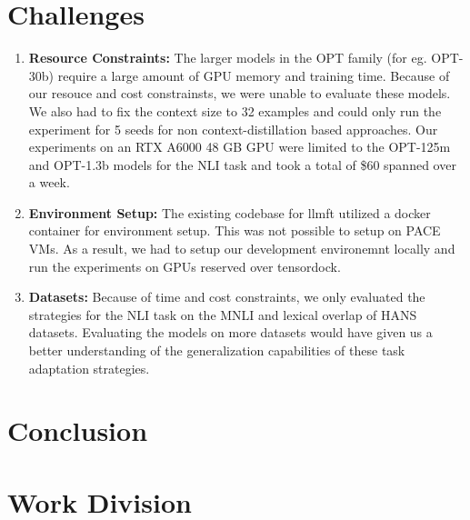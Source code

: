 \documentclass[10pt,twocolumn,letterpaper]{article}
\begin{document}
\section{Challenges}
\begin{enumerate}
    \item \textbf{Resource Constraints:} The larger models in the OPT family (for eg. OPT-30b) require a large amount of GPU memory and training time. Because of our resouce and cost constrainsts, we were unable to evaluate these models. We also had to fix the context size to 32 examples and could only run the experiment for 5 seeds for non context-distillation based approaches. Our experiments on an RTX A6000 48 GB GPU were limited to the OPT-125m and OPT-1.3b models for the NLI task and took a total of \$60 spanned over a week.
    \item \textbf{Environment Setup:} The existing codebase for llmft utilized a docker container for environment setup. This was not possible to setup on PACE VMs. As a result, we had to setup our development environemnt locally and run the experiments on GPUs reserved over tensordock.  
    \item \textbf{Datasets:} Because of time and cost constraints, we only evaluated the strategies for the NLI task on the MNLI and lexical overlap of HANS datasets. Evaluating the models on more datasets would have given us a better understanding of the generalization capabilities of these task adaptation strategies.
\end{enumerate}
\section{Conclusion}
\section{Work Division}
\end{document}
